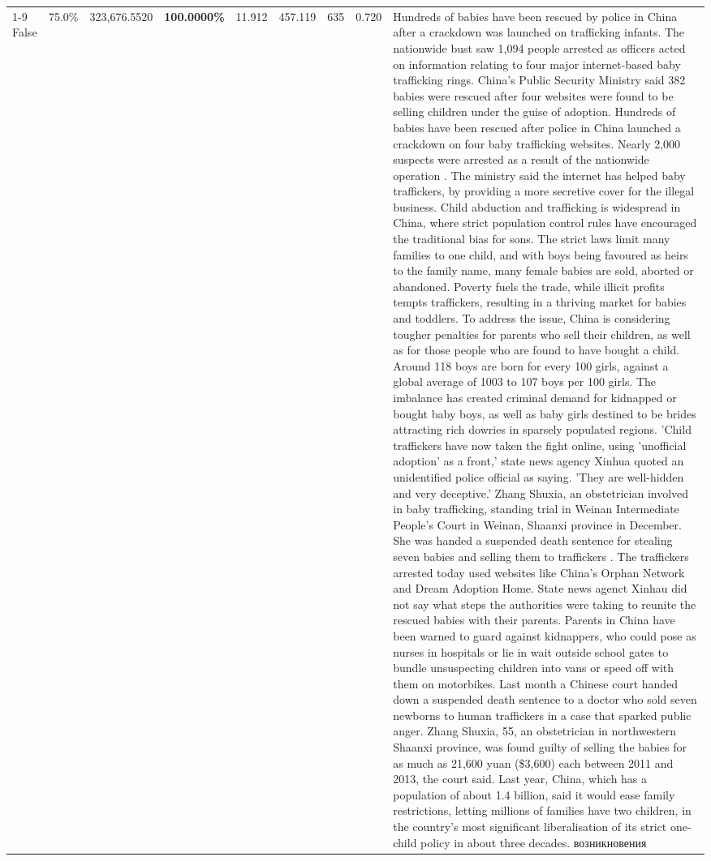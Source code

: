 \begin{table}[H]
\begin{tabular}{lllrlllll}
\cline{1-9}
False & 75.0\% & 323,676.5520 & \bfseries \color{red} 100.0000\% & 11.912 & 457.119 & 635 & 0.720 & Hundreds of babies have been rescued by police in China after a crackdown was launched on trafficking infants. The nationwide bust saw 1,094 people arrested as officers acted on information relating to four major internet-based baby trafficking rings. China's Public Security Ministry said 382 babies were rescued after four websites were found to be selling children under the guise of adoption. Hundreds of babies have been rescued after police in China launched a crackdown on four baby trafficking websites. Nearly 2,000 suspects were arrested as a result of the nationwide operation . The ministry said the internet has helped baby traffickers, by providing a more secretive cover for the illegal business. Child abduction and trafficking is widespread in China, where strict population control rules have encouraged the traditional bias for sons. The strict laws limit many families to one child, and with boys being favoured as heirs to the family name, many female babies are sold, aborted or abandoned. Poverty fuels the trade, while illicit profits tempts traffickers, resulting in a thriving market for babies and toddlers. To address the issue, China is considering tougher penalties for parents who sell their children, as well as for those people who are found to have bought a child. Around 118 boys are born for every 100 girls, against a global average of 1003 to 107 boys per 100 girls. The imbalance has created criminal demand for kidnapped or bought baby boys, as well as baby girls destined to be brides attracting rich dowries in sparsely populated regions. 'Child traffickers have now taken the fight online, using 'unofficial adoption' as a front,' state news agency Xinhua quoted an unidentified police official as saying. 'They are well-hidden and very deceptive.' Zhang Shuxia, an obstetrician involved in baby trafficking, standing trial in Weinan Intermediate People's Court in Weinan, Shaanxi province in December. She was handed a suspended death sentence for stealing seven babies and selling them to traffickers . The traffickers arrested today used websites like China's Orphan Network and Dream Adoption Home. State news agenct Xinhau did not say what steps the authorities were taking to reunite the rescued babies with their parents. Parents in China have been warned to guard against kidnappers, who could pose as nurses in hospitals or lie in wait outside school gates to bundle unsuspecting children into vans or speed off with them on motorbikes. Last month a Chinese court handed down a suspended death sentence to a doctor who sold seven newborns to human traffickers in a case that sparked public anger. Zhang Shuxia, 55, an obstetrician in northwestern Shaanxi province, was found guilty of selling the babies for as much as 21,600 yuan (\$3,600) each between 2011 and 2013, the court said. Last year, China, which has a population of about 1.4 billion, said it would ease family restrictions, letting millions of families have two children, in the country's most significant liberalisation of its strict one-child policy in about three decades. возникновения \\

\end{tabular}
\end{table}
